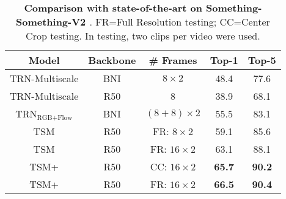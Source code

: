 \documentclass[runningheads]{llncs}
\begin{document}
\begin{table*}[h]
	\centering
	\begin{tabular}{c|c|c|c|c}
		\toprule
		{\bf Model } & {\bf Backbone }
		& {\bf \# Frames } & {\bf Top-1 } & {\bf Top-5 } \\
		\midrule
		TRN-Multiscale \cite{zhou2018temporal} & BNI & $8\times 2$  & 48.4 & 77.6\\
 		TRN-Multiscale \cite{zhou2018temporal} & R50 & 8 & 38.9 & 68.1\\
		TRN$_\text{RGB+Flow}$ \cite{zhou2018temporal} & BNI & $(8+8)\times 2$ &55.5 & 83.1\\
		\midrule
		TSM \cite{lin2019tsm} & R50 & FR: $8\times 2$ & 59.1 & 85.6\\
		TSM \cite{lin2019tsm} & R50 & FR: $16\times 2$ & 63.1 & 88.1\\
		\midrule
		TSM+{\bf \shortname{}}
		& R50 & CC: $16\times 2$ &\bf 65.7 &\bf 90.2 \\
		TSM+{\bf \shortname{}}
		& R50 & FR: $16\times 2$ &\bf 66.5 &\bf 90.4 \\		
		\bottomrule
	\end{tabular}
	\vspace{.1cm}
	\caption{
	{\bf Comparison with state-of-the-art on Something-Something-V2 \cite{mahdisoltani2018fine}}. 
	FR=Full Resolution testing;
	CC=Center Crop testing.
	In testing, two clips per video were used.
	}
	\label{table:SSV2}
\end{table*}
\end{document}
